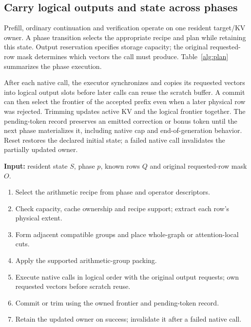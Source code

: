 \subsection{Carry logical outputs and state across phases}
Prefill, ordinary continuation and verification operate on one resident target/KV owner. A phase transition selects the appropriate recipe and plan while retaining this state. Output reservation specifies storage capacity; the original requested-row mask determines which vectors the call must produce. Table~\ref{alg:plan} summarizes the phase execution.

After each native call, the executor synchronizes and copies its requested vectors into logical output slots before later calls can reuse the scratch buffer. A commit can then select the frontier of the accepted prefix even when a later physical row was rejected. Trimming updates active KV and the logical frontier together. The pending-token record preserves an emitted correction or bonus token until the next phase materializes it, including native cap and end-of-generation behavior. Reset restores the declared initial state; a failed native call invalidates the partially updated owner.

\begin{table}[t]
\centering\footnotesize
\caption{Execution of one reference-derived phase.}
\label{alg:plan}
\begin{minipage}{\columnwidth}
\textbf{Input:} resident state $S$, phase $p$, known rows $Q$ and original requested-row mask $O$.
\begin{enumerate}[leftmargin=1.6em,itemsep=2pt,topsep=4pt]
\item Select the arithmetic recipe from phase and operator descriptors.
\item Check capacity, cache ownership and recipe support; extract each row's physical extent.
\item Form adjacent compatible groups and place whole-graph or attention-local cuts.
\item Apply the supported arithmetic-group packing.
\item Execute native calls in logical order with the original output requests; own requested vectors before scratch reuse.
\item Commit or trim using the owned frontier and pending-token record.
\item Retain the updated owner on success; invalidate it after a failed native call.
\end{enumerate}
\end{minipage}
\end{table}

